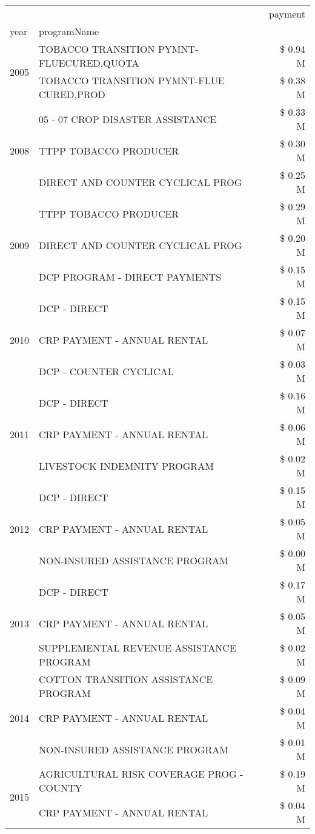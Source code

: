 \begin{tabular}{llr}
\toprule
 &  & payment \\
year & programName &  \\
\midrule
\multirow[t]{2}{*}{2005} & TOBACCO TRANSITION PYMNT-FLUECURED,QUOTA & \$ 0.94 M \\
 & TOBACCO TRANSITION PYMNT-FLUE CURED,PROD & \$ 0.38 M \\
\cline{1-3}
\multirow[t]{3}{*}{2008} & 05 - 07 CROP DISASTER ASSISTANCE & \$ 0.33 M \\
 & TTPP TOBACCO PRODUCER & \$ 0.30 M \\
 & DIRECT AND COUNTER CYCLICAL PROG & \$ 0.25 M \\
\cline{1-3}
\multirow[t]{3}{*}{2009} & TTPP TOBACCO PRODUCER & \$ 0.29 M \\
 & DIRECT AND COUNTER CYCLICAL PROG & \$ 0.20 M \\
 & DCP PROGRAM - DIRECT PAYMENTS & \$ 0.15 M \\
\cline{1-3}
\multirow[t]{3}{*}{2010} & DCP - DIRECT & \$ 0.15 M \\
 & CRP PAYMENT - ANNUAL RENTAL & \$ 0.07 M \\
 & DCP - COUNTER CYCLICAL & \$ 0.03 M \\
\cline{1-3}
\multirow[t]{3}{*}{2011} & DCP - DIRECT & \$ 0.16 M \\
 & CRP PAYMENT - ANNUAL RENTAL & \$ 0.06 M \\
 & LIVESTOCK INDEMNITY PROGRAM & \$ 0.02 M \\
\cline{1-3}
\multirow[t]{3}{*}{2012} & DCP - DIRECT & \$ 0.15 M \\
 & CRP PAYMENT - ANNUAL RENTAL & \$ 0.05 M \\
 & NON-INSURED ASSISTANCE PROGRAM & \$ 0.00 M \\
\cline{1-3}
\multirow[t]{3}{*}{2013} & DCP - DIRECT & \$ 0.17 M \\
 & CRP PAYMENT - ANNUAL RENTAL & \$ 0.05 M \\
 & SUPPLEMENTAL REVENUE ASSISTANCE PROGRAM & \$ 0.02 M \\
\cline{1-3}
\multirow[t]{3}{*}{2014} & COTTON TRANSITION ASSISTANCE PROGRAM & \$ 0.09 M \\
 & CRP PAYMENT - ANNUAL RENTAL & \$ 0.04 M \\
 & NON-INSURED ASSISTANCE PROGRAM & \$ 0.01 M \\
\cline{1-3}
\multirow[t]{3}{*}{2015} & AGRICULTURAL RISK COVERAGE PROG - COUNTY & \$ 0.19 M \\
 & CRP PAYMENT - ANNUAL RENTAL & \$ 0.04 M \\

\end{tabular}
